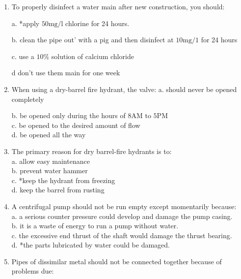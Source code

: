 \begin{enumerate}[1.]
\item To properly disinfect a water main after new construction, you should:

a. *apply $50 \mathrm{mg} / \mathrm{l}$ chlorine for 24 hours.

b. clean the pipe out' with a pig and then disinfect at $10 \mathrm{mg} / 1$ for 24 hours

c. use a $10 \%$ solution of calcium chloride

d don't use them main for one week

  \item When using a dry-barrel fire hydrant, the valve:
a. should never be opened completely

b. be opened only during the hours of $8 \mathrm{AM}$ to $5 \mathrm{PM}$\\

c. be opened to the desired amount of flow\\

d. be opened all the way\\

 \item The primary reason for dry barrel-fire hydrants is to:\\

a. allow easy maintenance\\

b. prevent water hammer\\

c. *keep the hydrant from freezing\\

d. keep the barrel from rusting \\


  \item A centrifugal pump should not be run empty except momentarily because:\\

a. a serious counter pressure could develop and damage the pump casing.\\

b. it is a waste of energy to run a pump without water.\\

c. the excessive end thrust of the shaft would damage the thrust bearing.\\

d. *the parts lubricated by water could be damaged.\\

  \item Pipes of dissimilar metal should not be connected together because of problems due:\\


\end{enumerate}
